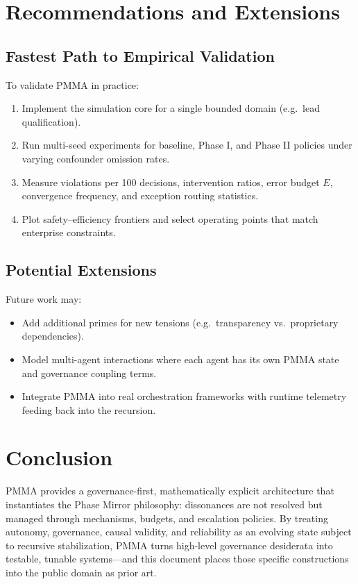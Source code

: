 \documentclass[11pt]{article}
\begin{document}
\section{Recommendations and Extensions}

\subsection{Fastest Path to Empirical Validation}

To validate PMMA in practice:
\begin{enumerate}
  \item Implement the simulation core for a single bounded domain (e.g.\ lead qualification).
  \item Run multi-seed experiments for baseline, Phase I, and Phase II policies under varying confounder omission rates.
  \item Measure violations per 100 decisions, intervention ratios, error budget $E$, convergence frequency, and exception routing statistics.
  \item Plot safety--efficiency frontiers and select operating points that match enterprise constraints.
\end{enumerate}

\subsection{Potential Extensions}

Future work may:
\begin{itemize}
  \item Add additional primes for new tensions (e.g.\ transparency vs.\ proprietary dependencies).
  \item Model multi-agent interactions where each agent has its own PMMA state and governance coupling terms.
  \item Integrate PMMA into real orchestration frameworks with runtime telemetry feeding back into the recursion.
\end{itemize}

\section*{Conclusion}

PMMA provides a governance-first, mathematically explicit architecture that instantiates the Phase Mirror philosophy: dissonances are not resolved but managed through mechanisms, budgets, and escalation policies.
By treating autonomy, governance, causal validity, and reliability as an evolving state subject to recursive stabilization, PMMA turns high-level governance desiderata into testable, tunable systems---and this document places those specific constructions into the public domain as prior art.
\end{document}
